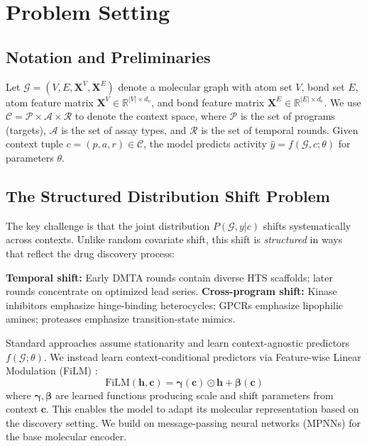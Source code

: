 \documentclass[runningheads]{llncs}
\newcommand{\film}{\text{FiLM}}
\begin{document}
\section{Problem Setting}
\label{sec:problem}

\subsection{Notation and Preliminaries}

Let $\mathcal{G} = (V, E, \mathbf{X}^V, \mathbf{X}^E)$ denote a molecular graph with atom set $V$, bond set $E$, atom feature matrix $\mathbf{X}^V \in \mathbb{R}^{|V| \times d_v}$, and bond feature matrix $\mathbf{X}^E \in \mathbb{R}^{|E| \times d_e}$. We use $\mathcal{C} = \mathcal{P} \times \mathcal{A} \times \mathcal{R}$ to denote the context space, where $\mathcal{P}$ is the set of programs (targets), $\mathcal{A}$ is the set of assay types, and $\mathcal{R}$ is the set of temporal rounds. Given context tuple $c = (p, a, r) \in \mathcal{C}$, the model predicts activity $\hat{y} = f(\mathcal{G}, c; \theta)$ for parameters $\theta$.

\subsection{The Structured Distribution Shift Problem}

The key challenge is that the joint distribution $P(\mathcal{G}, y | c)$ shifts systematically across contexts. Unlike random covariate shift, this shift is \textit{structured} in ways that reflect the drug discovery process:

\textbf{Temporal shift:} Early DMTA rounds contain diverse HTS scaffolds; later rounds concentrate on optimized lead series. \textbf{Cross-program shift:} Kinase inhibitors emphasize hinge-binding heterocycles; GPCRs emphasize lipophilic amines; proteases emphasize transition-state mimics.

Standard approaches assume stationarity and learn context-agnostic predictors $f(\mathcal{G}; \theta)$. We instead learn context-conditional predictors via Feature-wise Linear Modulation (FiLM) \cite{perez_2018_film}:
\begin{equation}
    \film(\mathbf{h}, \mathbf{c}) = \boldsymbol{\gamma}(\mathbf{c}) \odot \mathbf{h} + \boldsymbol{\beta}(\mathbf{c})
\end{equation}
where $\boldsymbol{\gamma}, \boldsymbol{\beta}$ are learned functions producing scale and shift parameters from context $\mathbf{c}$. This enables the model to adapt its molecular representation based on the discovery setting. We build on message-passing neural networks (MPNNs) \cite{gilmer_2017_mpnn} for the base molecular encoder.
\end{document}
